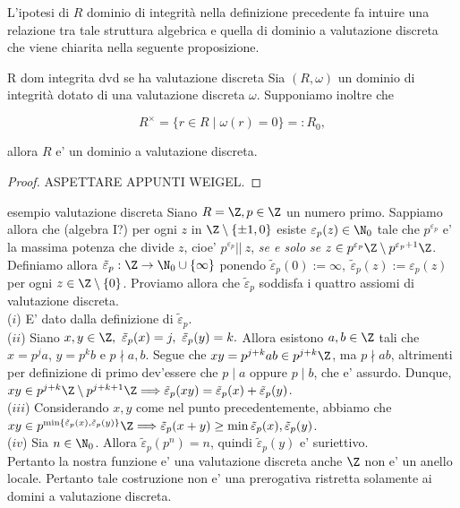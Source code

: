 \noindent L'ipotesi di $R$ dominio di integrità nella definizione precedente fa intuire una relazione tra tale struttura algebrica e quella di
dominio a valutazione discreta che viene chiarita nella seguente proposizione.

\begin{prop}[]{R dom integrita dvd se ha valutazione discreta}
  Sia $(R, \omega)$ un dominio di integrità dotato di una valutazione discreta $\omega$. Supponiamo inoltre che

  \[ R^{\times} = \big\{ r\in R \mid \omega(r) = 0 \big\} =: R_0,  \] 

  \noindent allora $R$ e' un dominio a valutazione discreta.
\end{prop}
\begin{proof}
  ASPETTARE APPUNTI WEIGEL.
\end{proof}

\begin{example}{esempio valutazione discreta}
  Siano $R = \Z, p\in \Z$ un numero primo. Sappiamo allora che (algebra I?) per ogni $z$ in $\Z \setminus \{\pm 1, 0\}$ esiste $\varepsilon_p(z) 
  \in \N_0$ tale che $p^{\varepsilon_p}$ e' la massima potenza che divide $z$, cioe' $p^{\varepsilon_p} ||\ z$, \emph{se e solo se} 
  $z \in p^{\varepsilon_p}\Z \setminus p^{\varepsilon_p + 1}\Z$.\\

  \noindent Definiamo allora $\tilde{\varepsilon}_p : \Z \rightarrow \N_0 \cup \{\infty\}$ ponendo $\tilde{\varepsilon}_p(0) := \infty,\ 
  \tilde{\varepsilon}_p(z) := \varepsilon_p(z)$ per ogni $z \in \Z\setminus \{0\}$. Proviamo allora che $\tilde{\varepsilon}_p$ soddisfa i quattro
  assiomi di valutazione discreta. \\
  ($i$) E' dato dalla definizione di $\tilde{\varepsilon}_p$. \\
  \noindent ($ii$) Siano $x,y \in \Z,\ \tilde{\varepsilon}_p(x) = j,\ \tilde{\varepsilon}_p(y) = k.$ Allora esistono $a,b \in \Z$ tali che
  \mbox{$x = p^ja$}, $y = p^kb$ e $p \nmid a,b$. Segue che $xy = p^{j+k}ab \in p^{j+k}\Z$, ma $p \nmid ab$, altrimenti per definizione di primo dev'essere che
  $p \mid a$ oppure $p \mid b$, che e' assurdo. Dunque, $xy \in p^{j+k} \Z \setminus p^{j+k+1} \Z \Longrightarrow \tilde{\varepsilon}_p(xy) = 
  \tilde{\varepsilon}_p(x) + \tilde{\varepsilon}_p(y)$. \\
  \noindent ($iii$) Considerando $x, y$ come nel punto precedentemente, abbiamo che \\
  $xy \in p^{\min\{ \tilde{\varepsilon}_p(x), \tilde{\varepsilon}_p(y) \}}\Z
  \Longrightarrow \tilde{\varepsilon}_p(x+y) \geq \min{\tilde{\varepsilon}_p(x), \tilde{\varepsilon}_p(y)}$. \\
  \noindent ($iv$) Sia $n \in \N_0$. Allora $\tilde{\varepsilon}_p(p^n) = n$, quindi $\tilde{\varepsilon}_p(y)$ e' suriettivo.\\

  \noindent Pertanto la nostra funzione e' una valutazione discreta anche $\Z$ non e' un anello locale. Pertanto tale costruzione non e' una prerogativa
  ristretta solamente ai domini a valutazione discreta.
\end{example}

